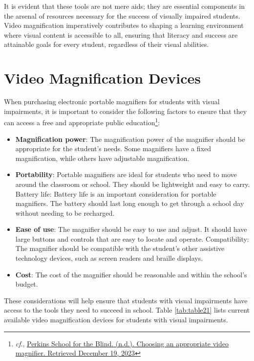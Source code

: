 It is evident that these tools are not mere aids; they are essential components in the arsenal of resources necessary for the success of visually impaired students. Video magnification imperatively contributes to shaping a learning environment where visual content is accessible to all, ensuring that literacy and success are attainable goals for every student, regardless of their visual abilities.


\pagebreak\hypertarget{video-magnification-devices}{}\section{Video Magnification
	Devices}\label{video-magnification-devices}
When purchasing electronic portable magnifiers for students with visual impairments, it is important to consider the following factors to ensure that they can access a free and appropriate public education\footnote{\raggedright \textit{cf}., \href{http://www.perkins.org/resource/choosing-appropriate-video-magnifier/}{Perkins School for the Blind. (n.d.). Choosing an appropriate video magnifier. Retrieved December 19, 2023}}:
\begin{itemize}[leftmargin=*]
	\item \textbf{Magnification power}: The magnification power of the magnifier should be appropriate for the student’s needs. Some magnifiers have a fixed magnification, while others have adjustable magnification.
	\item \textbf{Portability}: Portable magnifiers are ideal for students who need to move around the classroom or school. They should be lightweight and easy to carry.
	      Battery life: Battery life is an important consideration for portable magnifiers. The battery should last long enough to get through a school day without needing to be recharged.
	\item \textbf{Ease of use}: The magnifier should be easy to use and adjust. It should have large buttons and controls that are easy to locate and operate.
	      Compatibility: The magnifier should be compatible with the student’s other assistive technology devices, such as screen readers and braille displays.
	\item \textbf{Cost}: The cost of the magnifier should be reasonable and within the school’s budget.
\end{itemize}
These considerations will help ensure that students with visual impairments have access to the tools they need to succeed in school. Table \ref{tab:table21} lists current available video magnification devices for students with visual impairments.

